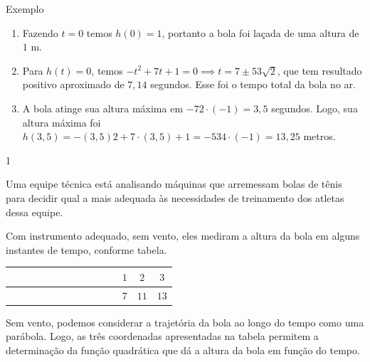 \def\currentcolor{cor1}
\begin{answer}{Exemplo}
{
\begin{enumerate}
\item Fazendo $t=0$ temos $h(0)=1$, portanto a bola foi laçada de uma altura de $1$ m.
\item Para $h(t)=0$, temos $-t^2+7t+1=0\implies t=7\pm53\sqrt{2}$, que tem resultado positivo aproximado de $7{,}14$ segundos. Esse foi o tempo total da bola no ar.
\item A bola atinge sua altura máxima em $-72\cdot(-1)=3{,}5$ segundos. Logo, sua altura máxima foi $h(3{,}5)=-(3{,}5)2+7\cdot(3{,}5)+1=−534\cdot(-1)=13{,}25$ metros.
\end{enumerate}
}{1}
\end{answer}
\def\currentcolor{session4}
\begin{example}{}

Uma equipe técnica está analisando máquinas que arremessam bolas de tênis para decidir qual a mais adequada às necessidades de treinamento dos atletas dessa equipe.

Com instrumento adequado, sem vento, eles mediram a altura da bola em alguns instantes de tempo, conforme tabela.

\begin{table}[H]
\centering
\begin{tabu} to \textwidth{|c|c|c|c|}
\hline
\cellcolor{\currentcolor!80}\textcolor{white}{\textbf Tempo em segundos} & \(1\) & \(2\) & \(3\) \\
\hline
\cellcolor{\currentcolor!80}\textcolor{white}{\textbf Altura em metros} & \(7\) & \(11\) & \(13\) \\
\hline
\end{tabu}
\end{table}


Sem vento, podemos considerar a trajetória da bola ao longo do tempo como uma parábola. Logo, as três coordenadas apresentadas na tabela permitem a determinação da função quadrática que dá a altura da bola em função do tempo.


\end{example}

